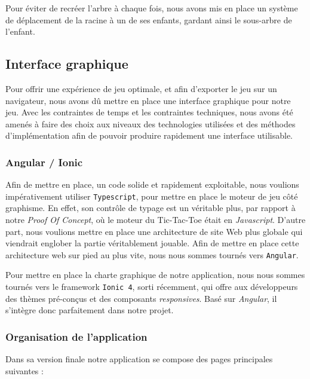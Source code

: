 \documentclass[a4paper,11pt]{article}
\begin{document}
Pour éviter de recréer l'arbre à chaque fois, nous avons mis en place un
système de déplacement de la racine à un de ses enfants, gardant ainsi
le sous-arbre de l'enfant.

\hypertarget{interface-graphique}{%
\subsection{Interface graphique}\label{interface-graphique}}

Pour offrir une expérience de jeu optimale, et afin d'exporter le jeu
sur un navigateur, nous avons dû mettre en place une interface graphique
pour notre jeu. Avec les contraintes de temps et les contraintes
techniques, nous avons été amenés à faire des choix aux niveaux des
technologies utilisées et des méthodes d'implémentation afin de pouvoir
produire rapidement une interface utilisable.

\hypertarget{angular-ionic}{%
\subsubsection{Angular / Ionic}\label{angular-ionic}}

Afin de mettre en place, un code solide et rapidement exploitable, nous
voulions impérativement utiliser \texttt{Typescript}, pour mettre en
place le moteur de jeu côté graphisme. En effet, son contrôle de typage
est un véritable plus, par rapport à notre \emph{Proof Of Concept}, où
le moteur du Tic-Tac-Toe était en \emph{Javascript}. D'autre part, nous
voulions mettre en place une architecture de site Web plus globale qui
viendrait englober la partie véritablement jouable. Afin de mettre en
place cette architecture web sur pied au plus vite, nous nous sommes
tournés vers \texttt{Angular}.

Pour mettre en place la charte graphique de notre application, nous nous
sommes tournés vers le framework \texttt{Ionic\ 4}, sorti récemment, qui
offre aux développeurs des thèmes pré-conçus et des composants
\emph{responsives}. Basé sur \emph{Angular}, il s'intègre donc
parfaitement dans notre projet.

\hypertarget{organisation-de-lapplication}{%
\subsubsection{Organisation de
l'application}\label{organisation-de-lapplication}}

Dans sa version finale notre application se compose des pages
principales suivantes :
\end{document}
